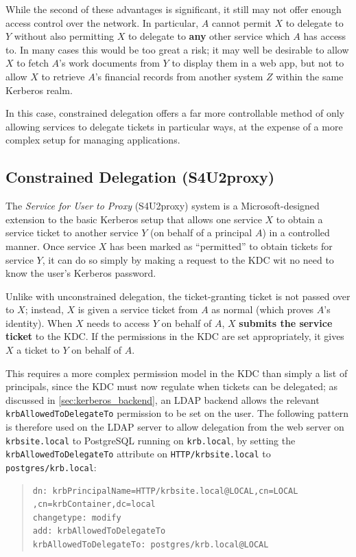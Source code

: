 \documentclass[12pt]{report}
\begin{document}
While the second of these advantages is significant, it still may not offer enough access control over the network. In particular, $A$ cannot permit $X$ to delegate to $Y$ without also permitting $X$ to delegate to \textbf{any} other service which $A$ has access to. In many cases this would be too great a risk; it may well be desirable to allow $X$ to fetch $A$'s work documents from $Y$ to display them in a web app, but not to allow $X$ to retrieve $A$'s financial records from another system $Z$ within the same Kerberos realm.

In this case, constrained delegation offers a far more controllable method of only allowing services to delegate tickets in particular ways, at the expense of a more complex setup for managing applications.

\subsection{Constrained Delegation (S4U2proxy)}
The \textit{Service for User to Proxy} (S4U2proxy) system is a Microsoft-designed extension to the basic Kerberos setup that allows one service $X$ to obtain a service ticket to another service $Y$ (on behalf of a principal $A$) in a controlled manner. Once service $X$ has been marked as ``permitted'' to obtain tickets for service $Y$, it can do so simply by making a request to the KDC wit no need to know the user's Kerberos password\cite{MS-s4u2}.

Unlike with unconstrained delegation, the ticket-granting ticket is not passed over to $X$; instead, $X$ is given a service ticket from $A$ as normal (which proves $A$'s identity). When $X$ needs to access $Y$ on behalf of $A$, $X$ \textbf{submits the service ticket} to the KDC. If the permissions in the KDC are set appropriately, it gives $X$ a ticket to $Y$ on behalf of $A$.

This requires a more complex permission model in the KDC than simply a list of principals, since the KDC must now regulate when tickets can be delegated; as discussed in \autoref{sec:kerberos_backend}, an LDAP backend allows the relevant \texttt{krbAllowedToDelegateTo} permission to be set on the user\cite{KRB-DELEG}. The following pattern is therefore used on the LDAP server to allow delegation from the web server on \verb+krbsite.local+ to PostgreSQL running on \verb+krb.local+, by setting the \texttt{krbAllowedToDelegateTo} attribute on \verb+HTTP/krbsite.local+ to \verb+postgres/krb.local+:

\begin{quote}
\begin{samepage}
\begin{verbatim}
dn: krbPrincipalName=HTTP/krbsite.local@LOCAL,cn=LOCAL
,cn=krbContainer,dc=local
changetype: modify
add: krbAllowedToDelegateTo
krbAllowedToDelegateTo: postgres/krb.local@LOCAL
\end{verbatim}
\end{samepage}
\end{quote}
\end{document}

